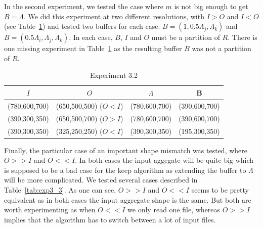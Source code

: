\documentclass[conference]{IEEEtran}
\begin{document}
In the second experiment, we tested the case where $m$ is not big enough to get
$B=\Lambda$. We did this experiment at two different resolutions, with $I>O$
and $I<O$ (see Table~\ref{tab:exp3_2}) and tested two buffers for each case:
$B=(1,0.5\Lambda_j,\Lambda_k)$ and $B=(0.5\Lambda_i,\Lambda_j,\Lambda_k)$.
In each case, $B$, $I$ and $O$ must be a partition of $R$. There is one missing
experiment in Table~\ref{tab:exp3_2} as the resulting buffer $B$ was not a
partition of $R$.

\begin{table}[ht]
 \centering
 \caption{Experiment 3.2}

  \begin{tabular}[t]{c c c c}
  \hline
    $I$ & $O$ & $\Lambda$ & B \\
    \hline\hline
    (780,600,700) & (650,500,500) ($O<I$) & (780,600,700) & (390,600,700) \\
    \hline
    (390,300,350) & (650,500,700) ($O>I$) & (780,600,700) & (390,600,700) \\
    \hline
    (390,300,350) & (325,250,250) ($O<I$) & (390,300,350) & (195,300,350) \\
    \hline
  \end{tabular}
  \label{tab:exp3_2}
\end{table}

Finally, the particular case of an important shape mismatch was tested, where
$O>>I$ and $O<<I$. In both cases the input aggegate will be quite big which is
supposed to be a bad case for the keep algorithm as extending the buffer to
$\Lambda$ will be more complicated. We tested several cases described in
Table~\ref{tab:exp3_3}. As one can see, $O>>I$ and $O<<I$ seems to be pretty
equivalent as in both cases the input aggregate shape is the same. But both are
worth experimenting as when $O<<I$ we only read one file, whereas $O>>I$ implies
that the algorithm has to switch between a lot of input files.
\end{document}
